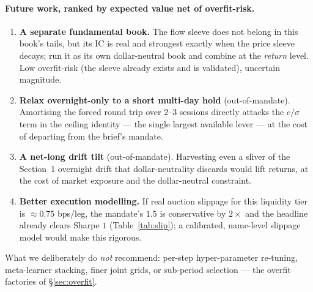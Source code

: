 \documentclass[11pt,a4paper]{article}
\begin{document}
\paragraph{Future work, ranked by expected value net of overfit-risk.}
\begin{enumerate}
\item \textbf{A separate fundamental book.} The flow sleeve does not belong in this book's tails, but its IC is
real and strongest exactly when the price sleeve decays; run it as its own dollar-neutral book and combine at
the \emph{return} level. Low overfit-risk (the sleeve already exists and is validated), uncertain magnitude.
\item \textbf{Relax overnight-only to a short multi-day hold} (out-of-mandate). Amortising the forced round trip
over $2$--$3$ sessions directly attacks the $c/\sigma$ term in the ceiling identity --- the single largest
available lever --- at the cost of departing from the brief's mandate.
\item \textbf{A net-long drift tilt} (out-of-mandate). Harvesting even a sliver of the Section~1 overnight drift
that dollar-neutrality discards would lift returns, at the cost of market exposure and the dollar-neutral
constraint.
\item \textbf{Better execution modelling.} If real auction slippage for this liquidity tier is $\approx0.75$
bps/leg, the mandate's $1.5$ is conservative by $2\times$ and the headline already clears Sharpe $1$
(Table~\ref{tab:slip}); a calibrated, name-level slippage model would make this rigorous.
\end{enumerate}
What we deliberately do \emph{not} recommend: per-step hyper-parameter re-tuning, meta-learner stacking, finer
joint grids, or sub-period selection --- the overfit factories of \S\ref{sec:overfit}.

\end{document}
